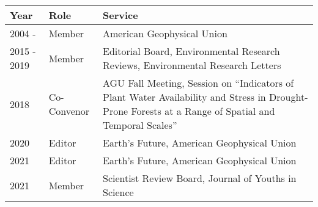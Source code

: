 
\begin{longtable}{llp{12cm}}
Year & Role & Service\\
\hline 
\endhead 
2004 -  & Member & American Geophysical Union \\
2015 - 2019 & Member & Editorial Board, Environmental Research Reviews, Environmental Research Letters \\
2018 & Co-Convenor & AGU Fall Meeting, Session on “Indicators of Plant Water Availability and Stress in Drought-Prone Forests at a Range of Spatial and Temporal Scales” \\
2020  & Editor & Earth’s Future, American Geophysical Union \\
2021 & Editor & Earth’s Future, American Geophysical Union \\
2021  & Member & Scientist Review Board, Journal of Youths in Science \\
\end{longtable}

